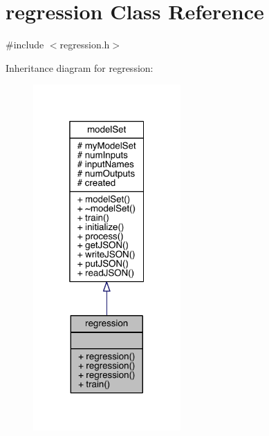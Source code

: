 \hypertarget{classregression}{}\section{regression Class Reference}
\label{classregression}


{\ttfamily \#include $<$regression.\+h$>$}



Inheritance diagram for regression\+:\nopagebreak
\begin{figure}[H]
\begin{center}
\leavevmode
\includegraphics[width=160pt]{classregression__inherit__graph}
\end{center}
\end{figure}


